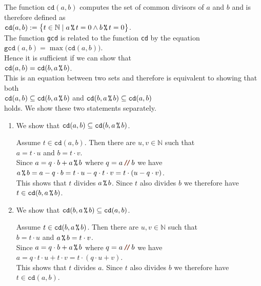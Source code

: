 \proof
The function $\mathtt{cd}(a, b)$ computes the set of common divisors of $a$ and $b$ and is therefore defined as
\\[0.2cm]
\hspace*{1.3cm}
 $\mathtt{cd}(a, b) := \bigl\{ t \in \mathbb{N} \mid a \,\texttt{\%}\, t = 0 \wedge b \,\texttt{\%}\, t = 0 \bigr\}$.
 \\[0.2cm]
The function \texttt{gcd} is related to the function \texttt{cd} by the equation
\\[0.2cm]
\hspace*{1.3cm}
$\mathtt{gcd}(a, b) = \max\bigl(\mathtt{cd}(a, b)\bigr)$.
\\[0.2cm]
Hence it is sufficient if we can show that
\\[0.2cm]
\hspace*{1.3cm}
  $\mathtt{cd}(a, b) = \mathtt{cd}(b, a \,\texttt{\%}\, b)$.
\\[0.2cm]
This is an equation between two sets and therefore is equivalent to showing that both
\\[0.2cm]
\hspace*{1.3cm}
  $\mathtt{cd}(a, b) \subseteq \mathtt{cd}(b, a \,\texttt{\%}\, b)$ \quad and \quad $\mathtt{cd}(b, a \,\texttt{\%}\, b) \subseteq \mathtt{cd}(a, b)$
\\[0.2cm]
holds.  We show these two statements separately.
\begin{enumerate}
\item We show that $\mathtt{cd}(a, b) \subseteq \mathtt{cd}(b, a \,\texttt{\%}\, b)$.

      Assume $t \in \mathtt{cd}(a, b)$.  Then there are $u, v \in \mathbb{N}$ such that
      \\[0.2cm]
      \hspace*{1.3cm}
      $a = t \cdot u$ \quad and \quad $b = t \cdot v$.
      \\[0.2cm]
      Since $a = q \cdot b + a \,\texttt{\%}\, b$ where $q = a \dv b$ we have
      \\[0.2cm]
      \hspace*{1.3cm}
      $a \,\texttt{\%}\, b = a - q \cdot b = t \cdot u - q \cdot t \cdot v = t \cdot (u - q \cdot v)$.
      \\[0.2cm]
      This shows that $t$ divides $a \,\texttt{\%}\, b$. Since $t$ also divides $b$ we therefore have
      $t \in \mathtt{cd}(b, a \,\texttt{\%}\, b)$. \green{$\surd$}
\item We show that $\mathtt{cd}(b, a \,\texttt{\%}\, b) \subseteq \mathtt{cd}(a, b)$.

      Assume $t \in \mathtt{cd}(b, a \,\texttt{\%}\, b)$.  Then there are $u, v \in \mathbb{N}$ such that
      \\[0.2cm]
      \hspace*{1.3cm}
      $b = t \cdot u$ \quad and \quad $a \,\texttt{\%}\, b = t \cdot v$.
      \\[0.2cm]
      Since $a = q \cdot b + a \,\texttt{\%}\, b$ where $q = a \dv b$ we have
      \\[0.2cm]
      \hspace*{1.3cm}
      $a = q \cdot t \cdot u + t \cdot v = t \cdot (q \cdot u + v)$.
      \\[0.2cm]
      This shows that $t$ divides $a$. Since $t$ also divides $b$ we therefore have
      $t \in \mathtt{cd}(a, b)$. \green{$\surd$}
\end{enumerate}
